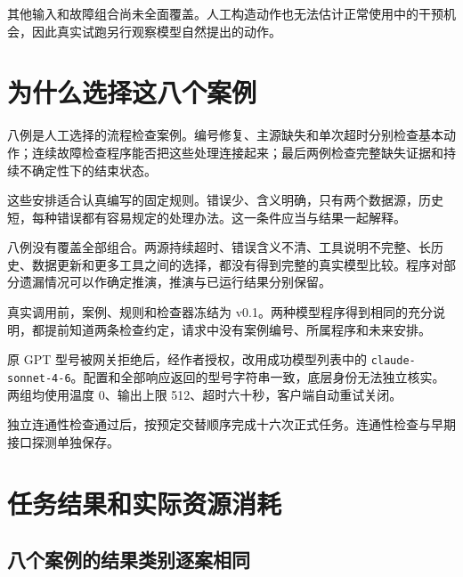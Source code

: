 \documentclass[12pt,a4paper,UTF8,fontset=none]{ctexart}
\begin{document}
其他输入和故障组合尚未全面覆盖。人工构造动作也无法估计正常使用中的干预机会，因此真实试跑另行观察模型自然提出的动作。


\section{为什么选择这八个案例}

八例是人工选择的流程检查案例。编号修复、主源缺失和单次超时分别检查基本动作；连续故障检查程序能否把这些处理连接起来；最后两例检查完整缺失证据和持续不确定性下的结束状态。


这些安排适合认真编写的固定规则。错误少、含义明确，只有两个数据源，历史短，每种错误都有容易规定的处理办法。这一条件应当与结果一起解释。


八例没有覆盖全部组合。两源持续超时、错误含义不清、工具说明不完整、长历史、数据更新和更多工具之间的选择，都没有得到完整的真实模型比较。程序对部分遗漏情况可以作确定推演，推演与已运行结果分别保留。


真实调用前，案例、规则和检查器冻结为 v0.1。两种模型程序得到相同的充分说明，都提前知道两条检查约定，请求中没有案例编号、所属程序和未来安排。


原 GPT 型号被网关拒绝后，经作者授权，改用成功模型列表中的 \texttt{claude-\allowbreak{}sonnet-\allowbreak{}4-\allowbreak{}6}。配置和全部响应返回的型号字符串一致，底层身份无法独立核实。两组均使用温度 0、输出上限 512、超时六十秒，客户端自动重试关闭。


独立连通性检查通过后，按预定交替顺序完成十六次正式任务。连通性检查与早期接口探测单独保存。


\section{任务结果和实际资源消耗}

\subsection{八个案例的结果类别逐案相同}
\end{document}
